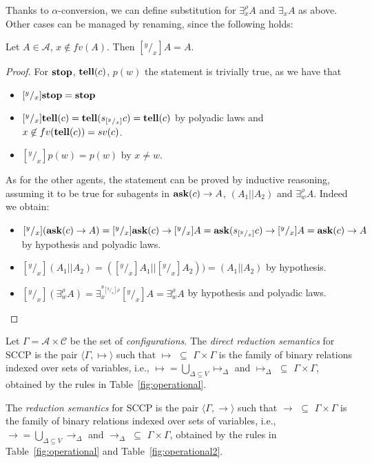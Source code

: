 \documentclass{llncs}
\def\C{{\mathcal C}}
\newcommand{\tell}{{\bf tell}}
\newcommand{\ask}{{\bf ask}}
\newcommand{\ostop}{{\bf stop}}
\newcommand{\rarrow}{\rightarrow}
\def\C{{\mathcal C}}
\begin{document}
Thanks to $\alpha$-conversion, we can define substitution for $\exists^{\rho}_x A$ and $\exists_x A$ 
as above. Other cases can be managed by renaming, since the following holds:

\begin{proposition}
Let $A \in \mathcal{A}$, $x \not \in fv(A)$. Then $[^y/_x]A = A$.
\end{proposition}

\begin{proof}
For $\ostop$, $\tell(c)$, $p(w)$ the statement is trivially true, as we have that
\begin{itemize}
	\item $[^y/_x]\ostop = \ostop$
	\item $[^y/_x]\tell(c) = \tell(s_{[^y/_x]}c) = \tell(c)$ by polyadic laws and $x \not
	\in fv(\tell(c)) = sv(c)$.
	\item $[^y/_x]p(w) = p(w)$ by $x \not = w$.
\end{itemize}
As for the other agents, the statement can be proved by inductive reasoning, assuming it to be true for subagents in $\ask(c) \rightarrow A$, $(A_1 || A_2)$ and $\exists^{\rho}_w A$. Indeed we obtain:
\begin{itemize}
	\item $[^y/_x](\ask(c) \rightarrow A) = [^y/_x]\ask(c) \rightarrow [^y/_x]A = 
	\ask(s_{[^y/_x]}c) \rightarrow [^y/_x]A = \ask(c) \rightarrow A$
	by hypothesis and polyadic laws.
	\item $[^y/_x](A_1 || A_2) = ([^y/_x]A_1 || [^y/_x]A_2)) = (A_1 || A_2)$
	by hypothesis.
	\item $[^y/_x](\exists^{\rho}_w A) = \exists^{s_{[^y/_x]\rho}}_x [^y/_x]A = \exists^{\rho}_w A$
	by hypothesis and polyadic laws.
\end{itemize}
\end{proof}

\begin{definition}[Reductions]\label{def:reductions}
Let $\Gamma = {\mathcal A} \times \C$ be the set of \emph{configurations}.
The \emph{direct reduction semantics} for SCCP is the pair 
$\langle \Gamma,  \mapsto \rangle$
such that $\mapsto \, \, \subseteq \, \,\Gamma \times   \Gamma$ is the family 
 of binary relations indexed over sets of variables,
i.e., $\mapsto = \bigcup_{\Delta \subseteq V} \mapsto_\Delta$ and 
$\mapsto_\Delta \, \, \subseteq \, \,\Gamma \times \Gamma$, obtained by the rules in 
Table~\ref{fig:operational}.

The \emph{reduction semantics} for SCCP is the pair 
$\langle \Gamma,  \rightarrow \rangle$
such that $\rightarrow \, \, \subseteq \, \,\Gamma \times   \Gamma$ is the family 
 of binary relations indexed over sets of variables,
i.e., $\rightarrow = \bigcup_{\Delta \subseteq V} \rarrow_\Delta$ and 
$\rarrow_\Delta \, \, \subseteq \, \,\Gamma \times \Gamma$, obtained by the rules in 
Table~\ref{fig:operational} and Table~\ref{fig:operational2}.
\end{definition}
\end{document}
